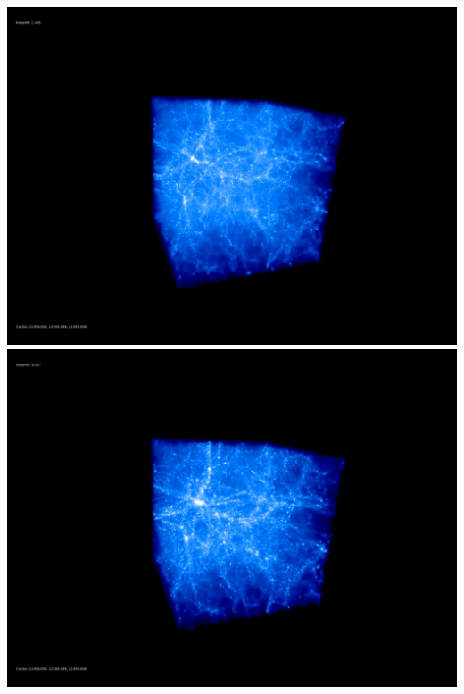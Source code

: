 \includegraphics[scale=0.1]{r256/stages_51/50.jpg} 
\includegraphics[scale=0.1]{r256/stages_51/100.jpg}  \\

